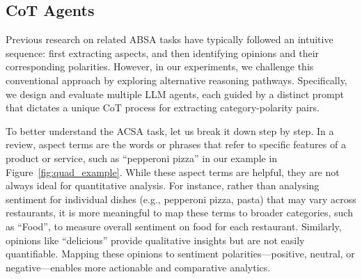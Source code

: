 \documentclass[11pt]{article}
\begin{document}




\subsection{CoT Agents}
\label{sec:cot_agents}
Previous research on related ABSA tasks \citep{fei-etal-2023-reasoning,10499502} have typically followed an intuitive sequence: first extracting aspects, and then identifying opinions and their corresponding polarities. However, in our experiments, we challenge this conventional approach by exploring alternative reasoning pathways. Specifically, we design and evaluate multiple LLM agents, each guided by a distinct prompt that dictates a unique CoT process for extracting category-polarity pairs.

To better understand the ACSA task, let us break it down step by step. In a review, aspect terms are the words or phrases that refer to specific features of a product or service, such as ``pepperoni pizza'' in our example in Figure~\ref{fig:quad_example}. While these aspect terms are helpful, they are not always ideal for quantitative analysis. For instance, rather than analysing sentiment for individual dishes (e.g., pepperoni pizza, pasta) that may vary across restaurants, it is more meaningful to map these terms to broader categories, such as ``Food'', to measure overall sentiment on food for each restaurant. Similarly, opinions like ``delicious'' provide qualitative insights but are not easily quantifiable. Mapping these opinions to sentiment polarities—positive, neutral, or negative—enables more actionable and comparative analytics.
\end{document}
